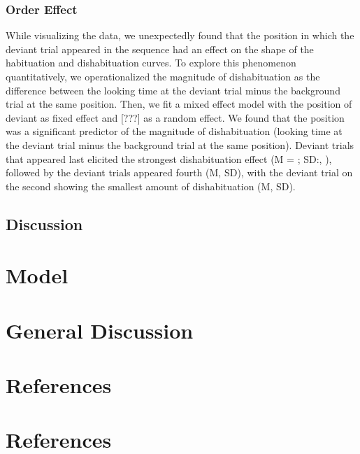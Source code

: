 \documentclass[10pt, letterpaper]{article}
\begin{document}
\hypertarget{order-effect}{%
\subsubsection{Order Effect}\label{order-effect}}

While visualizing the data, we unexpectedly found that the position in
which the deviant trial appeared in the sequence had an effect on the
shape of the habituation and dishabituation curves. To explore this
phenomenon quantitatively, we operationalized the magnitude of
dishabituation as the difference between the looking time at the deviant
trial minus the background trial at the same position. Then, we fit a
mixed effect model with the position of deviant as fixed effect and
{[}???{]} as a random effect. We found that the position was a
significant predictor of the magnitude of dishabituation (looking time
at the deviant trial minus the background trial at the same position).
Deviant trials that appeared last elicited the strongest dishabituation
effect (M = ; SD:, ), followed by the deviant trials appeared fourth (M,
SD), with the deviant trial on the second showing the smallest amount of
dishabituation (M, SD).

\hypertarget{discussion}{%
\subsection{Discussion}\label{discussion}}

\hypertarget{model}{%
\section{Model}\label{model}}

\hypertarget{general-discussion}{%
\section{General Discussion}\label{general-discussion}}

\hypertarget{references}{%
\section{References}\label{references}}

\hypertarget{references-1}{%
\section{References}\label{references-1}}

\setlength{\parindent}{-0.1in} 
\setlength{\leftskip}{0.125in}

\noindent


\end{document}
